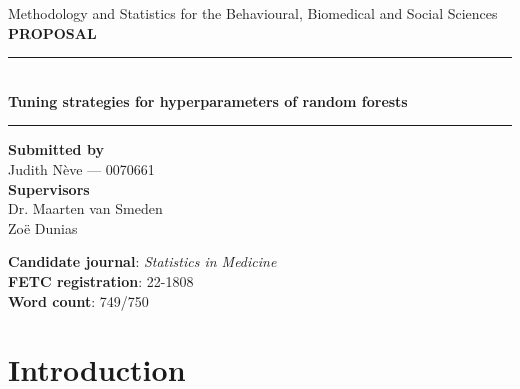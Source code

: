 \documentclass{article}
\begin{document}
\begin{titlepage}

\begin{center}
\Large Methodology and Statistics for the Behavioural, Biomedical and Social Sciences\\
\vspace{0.15\textwidth}
\textbf{\LARGE PROPOSAL} 

\vspace{0.05\textwidth}

\rule{\textwidth}{1pt}\\[0.8cm]

\textbf { \LARGE Tuning strategies for hyperparameters of random forests}
\\ [0.5cm]

\rule{\textwidth}{1pt}

\vspace{0.1\textwidth}

\end{center}
\vspace{0.05\textwidth}
\begin{Large}
\begin{center}
    \textbf{Submitted by}\\ 
    Judith N\`eve --- 0070661\\
    \vspace{0.1\textwidth}
    \textbf{Supervisors}\\
    Dr. Maarten van Smeden\\
    Zo\"e Dunias\\

\vspace{0.15\textwidth}

\end{center}
\end{Large}

\vspace{0.2\textwidth}
\begin{large}
\textbf{Candidate journal}: \textit{Statistics in Medicine}\\
\textbf{FETC registration}: 22-1808\\
\textbf{Word count}: 749/750
\end{large}
\end{titlepage}

\newpage

\section{Introduction}
\end{document}
